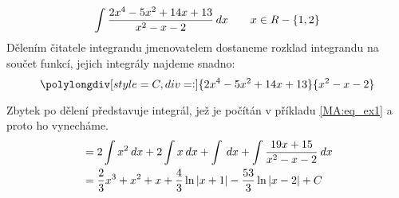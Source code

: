   \small\begin{example}
    \begin{equation}\label{mai:int_ex_02}
      \int{\frac{2x^4-5x^2+14x+13}{x^2-x-2}\hspace{2pt}dx} \qquad x\in R - \{1,2\}
    \end{equation}
    Dělením čitatele integrandu jmenovatelem dostaneme rozklad integrandu na součet funkcí, jejich 
    integrály najdeme snadno:
    \begin{equation*}
      \polylongdiv[style=C,div=:]{2x^4-5x^2+14x+13}{x^2-x-2}
    \end{equation*}\small

    Zbytek po dělení představuje integrál, jež je počítán v příkladu \ref{MA:eq_ex1} a proto ho 
    vynecháme. 
    \begin{align*}
       &= 2\int x^2\hspace{2pt}dx + 2\int x\hspace{2pt}dx + \int\hspace{2pt}dx + \int\frac{19x+15}{x^2-x-2}\hspace{2pt}dx     \\
       &= \frac{2}{3}x^3 + x^2 + x + \frac{4}{3}\ln|x+1| - \frac{53}{3}\ln|x-2| + C 
    \end{align*}
  \end{example}